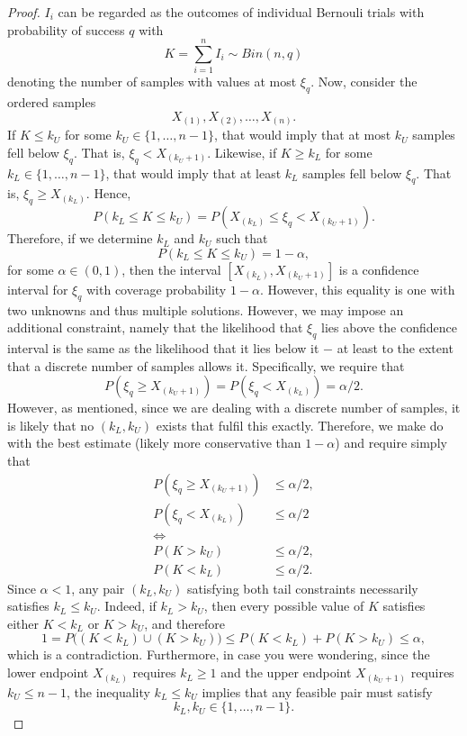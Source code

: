 \documentclass{article}
\begin{document}
\begin{proof}
$I_i$ can be regarded as the outcomes of individual Bernouli trials with probability of success $q$ with
$$K=\sum_{i=1}^nI_i\sim Bin(n,q)$$
denoting the number of samples with values at most $\xi_q$. Now, consider the ordered samples
$$X_{(1)},X_{(2)},\ldots,X_{(n)}.$$
If $K\leq k_U$ for some $k_U\in\{1,\ldots,n-1\}$, that would imply that at most $k_U$ samples fell below $\xi_q$. That is, $\xi_q<X_{(k_U+1)}$. Likewise, if $K\geq k_L$ for some $k_L\in\{1,\ldots,n-1\}$, that would imply that at least $k_L$ samples fell below $\xi_q$. That is, $\xi_q\geq X_{(k_L)}$. Hence,
$$P(k_L\leq K\leq k_U)=P(X_{(k_L)}\leq\xi_q<X_{(k_U+1)}).$$
Therefore, if we determine $k_L$ and $k_U$ such that
$$P(k_L\leq K \leq k_U)=1-\alpha,$$
for some $\alpha\in(0,1)$, then the interval $[X_{(k_L)},X_{(k_U+1)}]$ is a confidence interval for $\xi_q$ with coverage probability $1-\alpha$. However, this equality is one with two unknowns and thus multiple solutions. However, we may impose an additional constraint, namely that the likelihood that $\xi_q$ lies above the confidence interval is the same as the likelihood that it lies below it $-$ at least to the extent that a discrete number of samples allows it. Specifically, we require that
$$P(\xi_q\geq X_{(k_U+1)})=P(\xi_q<X_{(k_L)})=\alpha/2.$$
However, as mentioned, since we are dealing with a discrete number of samples, it is likely that no $(k_L,k_U)$ exists that fulfil this exactly. Therefore, we make do with the best estimate (likely more conservative than $1-\alpha$) and require simply that
$$
\begin{aligned}
P(\xi_q \geq X_{(k_U+1)})&\leq \alpha/2,\\
P(\xi_q<X_{(k_L)})&\leq \alpha/2\\
\Leftrightarrow\\
P(K>k_U)&\leq \alpha/2,\\
P(K<k_L)&\leq \alpha/2.
\end{aligned}
$$
Since $\alpha<1$, any pair $(k_L,k_U)$ satisfying both tail constraints necessarily satisfies $k_L\leq k_U$. Indeed, if $k_L>k_U$, then every possible value of $K$ satisfies either $K<k_L$ or $K>k_U$, and therefore
$$
1=P\big((K<k_L)\cup(K>k_U)\big)
\leq P(K<k_L)+P(K>k_U)
\leq \alpha,
$$
which is a contradiction. Furthermore, in case you were wondering, since the lower endpoint $X_{(k_L)}$ requires $k_L\geq1$ and the upper endpoint $X_{(k_U+1)}$ requires $k_U\leq n-1$, the inequality $k_L\leq k_U$ implies that any feasible pair must satisfy
$$
k_L,k_U\in\{1,\ldots,n-1\}.
$$

\end{proof}
\end{document}
